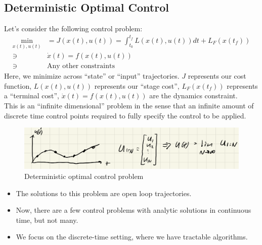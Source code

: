 \\

\subsection{Deterministic Optimal Control}
Let's consider the following control problem:
\begin{align}
    \min_{x(t), u(t)} &= J(x(t), u(t)) = \int_{t_0}^{t_f} L(x(t), u(t)) dt + L_{F} (x(t_f)) \\
    \ni \ &\dot{x}(t) = f(x(t), u(t)) \\
    \ni \ &\textrm{Any other constraints} 
\end{align}
Here, we minimize across ``state'' or ``input'' trajectories. $J$ represents our cost function, $L(x(t), u(t))$ represents our ``stage cost'', $L_{F} (x(t_f))$ represents a ``terminal cost'', $\dot{x}(t) = f(x(t), u(t))$ are the dynamics constraint. \\

\noindent
This is an ``infinite dimensional'' problem in the sense that an infinite amount of discrete time control points required to fully specify the control to be applied. 
\begin{figure}[h!]
    \centering
    \includegraphics[width=0.4\linewidth]{L5_Images/L51.PNG}
    \caption{Deterministic optimal control problem}
    \label{fig:l5f1}
\end{figure}
\begin{itemize}
    \item The solutions to this problem are open loop trajectories. 
    \item Now, there are a few control problems with analytic solutions in continuous time, but not many. 
    \item We focus on the discrete-time setting, where we have tractable algorithms.
\end{itemize}


